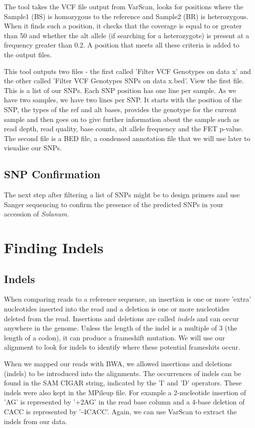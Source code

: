 \documentclass[12pt,a4paper]{article}
\begin{document}
The tool takes the VCF file output from VarScan, looks for positions
where the Sample1 (BS) is homozygous to the reference and Sample2 (BR)
is heterozygous. When it finds such a position, it checks that the
coverage is equal to or greater than 50 and whether the alt allele (if
searching for a heterozygote) is present at a frequency greater than
0.2. A position that meets all these criteria is added to the output
files.

This tool outputs two files - the first called 'Filter VCF Genotypes
on data x' and the other called 'Filter VCF Genotypes SNPs on data
x.bed'. View the first file. This is a list of our SNPs. Each SNP
position has one line per sample. As we have two samples, we have two
lines per SNP. It starts with the position of the SNP, the types of
the ref and alt bases, provides the genotype for the current sample
and then goes on to give further information about the sample such as
read depth, read quality, base counts, alt allele frequency and the
FET p-value. The second file is a BED file, a condensed annotation
file that we will use later to visualise our SNPs.

\subsection{SNP Confirmation}

The next step after filtering a list of SNPs might be to design
primers and use Sanger sequencing to confirm the presence of the
predicted SNPs in your accession of \emph{Solanum}.

\section{Finding Indels}

\subsection{Indels}

When comparing reads to a reference sequence, an insertion is one or
more 'extra' nucleotides inserted into the read and a deletion is one
or more nucleotides deleted from the read. Insertions and deletions
are called \emph{indels} and can occur anywhere in the genome. Unless
the length of the indel is a multiple of 3 (the length of a codon), it
can produce a frameshift mutation. We will use our alignment to look
for indels to identify where these potential frameshits occur.

When we mapped our reads with BWA, we allowed insertions and deletions
(indels) to be introduced into the alignments. The occurrences of
indels can be found in the SAM CIGAR string, indicated by the 'I' and
'D' operators. These indels were also kept in the MPileup file.  For
example a 2-nucleotide insertion of 'AG' is represented by '+2AG' in
the read base column and a 4-base deletion of CACC is represented by
'-4CACC'. Again, we can use VarScan to extract the indels from our
data.
\end{document}
